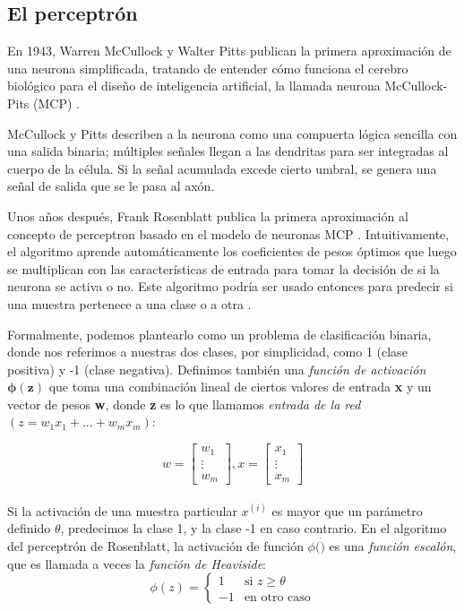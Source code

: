\subsection{El perceptrón}
En 1943, Warren McCullock y Walter Pitts publican la primera aproximación de una
neurona simplificada, tratando de entender cómo funciona el cerebro biológico para
el diseño de inteligencia artificial, la llamada neurona McCullock-Pits (MCP) \cite{mcp}.

McCullock y Pitts describen a la neurona como una compuerta lógica sencilla con una
salida binaria; múltiples señales llegan a las dendritas para ser integradas al cuerpo
de la célula. Si la señal acumulada excede cierto umbral, se genera una señal de salida
que se le pasa al axón.

Unos años después, Frank Rosenblatt publica la primera aproximación al concepto de
perceptron basado en el modelo de neuronas MCP \cite{rosenblatt}. Intuitivamente, el algoritmo
aprende automáticamente los coeficientes de pesos óptimos que luego se multiplican
con las características de entrada para tomar la decisión de si la neurona se activa
o no. Este algoritmo podría ser usado entonces para predecir si una muestra pertenece
a una clase o a otra \cite{python}.

Formalmente, podemos plantearlo como un problema de clasificación binaria, donde nos
referimos a nuestras dos clases, por simplicidad, como 1 (clase positiva) y -1
(clase negativa). Definimos también una \textit{función de activación $\mathbf{\phi (z)}$}
que toma una combinación lineal de ciertos valores de entrada \textbf{x} y un
vector de pesos \textbf{w}, donde \textbf{z} es lo que llamamos \textit{entrada de la red}
$(z = w_1x_1 + ... + w_mx_m)$:

\begin{equation*}
w=
    \begin{bmatrix}
        w_1 \\
        \vdots \\
        w_m
    \end{bmatrix}
    , x=
    \begin{bmatrix}
      x_1 \\
      \vdots \\
      x_m
    \end{bmatrix}
\end{equation*}
\\
Si la activación de una muestra particular $x^{(i)}$ es mayor que un parámetro definido
$\theta$, predecimos la clase 1, y la clase -1 en caso contrario. En el algoritmo
del perceptrón de Rosenblatt, la activación de función $\phi (\dot)$ es una \textit{función escalón},
que es llamada a veces la \textit{función de Heaviside}:
\begin{equation*}
  \phi(z)= \left\{ \begin{array} {rl}
    1 & \text{si } z \geq \theta \\
    -1 & \text{en otro caso} \end{array} \right.
\end{equation*}

